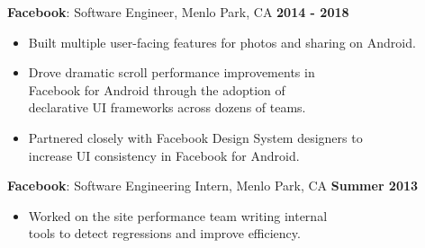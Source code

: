 \documentclass[sectioned]{dsyangres}
\begin{document}
\begin{resume}
\textbf{Facebook}: Software Engineer, Menlo Park, CA \hfill \textbf{2014 - 2018}
  \begin{itemize}
      \item Built multiple user-facing features for photos and sharing on Android.
      \item Drove dramatic scroll performance improvements in 
         \\ Facebook for Android through the adoption of 
         \\ declarative UI frameworks across dozens of teams.
      \item Partnered closely with Facebook Design System designers to 
         \\ increase UI consistency in Facebook for Android.
  \end{itemize}
%


\textbf{Facebook}: Software Engineering Intern,
Menlo Park, CA \hfill \textbf{Summer 2013}
  \begin{itemize} \itemsep -2pt
    \item Worked on the site performance team writing internal \\
      tools to detect regressions and improve efficiency.
  \end{itemize}



\end{resume}
\end{document}
